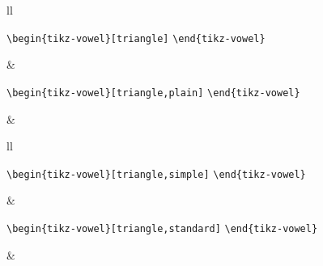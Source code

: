 \documentclass{article}
\def\\{}%
\begin{document}
\begin{center}
\begin{tabular}{ll}
  \begin{minipage}[t]{6.5cm}{\small
    \verb|\begin{tikz-vowel}[triangle]|\\
    \verb|\end{tikz-vowel}|\\}
  \end{minipage} &
  \begin{minipage}[t]{6.5cm}{\small
    \verb|\begin{tikz-vowel}[triangle,plain]|\\
    \verb|\end{tikz-vowel}|\\}
  \end{minipage} \\
  \begin{minipage}[t]{6.5cm}{
  \begin{tikz-vowel}[triangle]\end{tikz-vowel} \\}\end{minipage} &
  \begin{minipage}[t]{6.5cm}{
  \begin{tikz-vowel}\end{tikz-vowel} \\}\end{minipage}
\end{tabular}

\begin{tabular}{ll}
  \begin{minipage}[t]{6.5cm}{\small
    \verb|\begin{tikz-vowel}[triangle,simple]|\\
    \verb|\end{tikz-vowel}|\\}
  \end{minipage} &
  \begin{minipage}[t]{6.5cm}{\small
    \verb|\begin{tikz-vowel}[triangle,standard]|\\
    \verb|\end{tikz-vowel}|\\}
  \end{minipage} \\
  \begin{minipage}[t]{6.5cm}{
  \begin{tikz-vowel}\end{tikz-vowel} \\}\end{minipage} &
  \begin{minipage}[t]{6.5cm}{
  \begin{tikz-vowel}\end{tikz-vowel} \\}\end{minipage}
\end{tabular}


\end{center}
\end{document}
